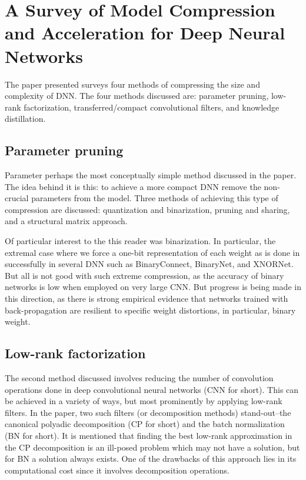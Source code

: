 \section{A Survey of Model Compression and Acceleration for Deep Neural Networks}

The paper presented surveys four methods of compressing the size and complexity
of DNN. The four methods discussed are: parameter pruning, low-rank
factorization, transferred/compact convolutional filters, and knowledge
distillation.

\subsection{Parameter pruning}
Parameter perhaps the most conceptually simple method discussed in the paper.
The idea behind it is this: to achieve a more compact DNN remove the non-crucial
parameters from the model. Three methods of achieving this type of compression
are discussed: quantization and binarization, pruning and sharing, and a
structural matrix approach. 

Of particular interest to the this reader was binarization. In particular, the
extremal case where we force a one-bit representation of each weight as is done
in successfully in several DNN such as BinaryConnect, BinaryNet, and XNORNet.
But all is not good with such extreme compression, as the accuracy of binary
networks is low when employed on very large CNN. But progress is being made in
this direction, as there is strong empirical evidence that networks trained with
back-propagation are resilient to specific weight distortions, in particular,
binary weight.

\subsection{Low-rank factorization}
The second method discussed involves reducing the number of convolution
operations done in deep convolutional neural networks (CNN for short). This can
be achieved in a variety of ways, but most prominently by applying low-rank
filters. In the paper, two such filters (or decomposition methods)
stand-out--the canonical polyadic decomposition (CP for short) and the batch
normalization (BN for short). It is mentioned that finding the best low-rank
approximation in the CP decomposition is an ill-posed problem which may not have
a solution, but for BN a solution always exists. One of the drawbacks of this
approach lies in its computational cost since it involves decomposition
operations.

